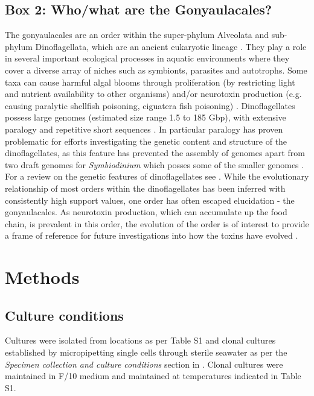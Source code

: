 \documentclass[fleqn,10pt,lineno]{wlpeerj} %
\begin{document}
\subsection*{Box 2: Who/what are the Gonyaulacales?}
\label{sec:dinobox}
The gonyaulacales are an order within the super-phylum Alveolata and sub-phylum Dinoflagellata, which are an ancient eukaryotic lineage \cite{moldowan1998biogeochemical}. 
They play a role in several important ecological processes in aquatic environments where they cover a diverse array of niches such as symbionts, parasites and autotrophs. 
Some taxa can cause harmful algal blooms through proliferation (by restricting light and nutrient availability to other organisms) and/or neurotoxin production (e.g. causing paralytic shellfish poisoning, ciguatera fish poisoning) \cite{murray2016unravelling}.
Dinoflagellates possess large genomes (estimated size range 1.5 to 185 Gbp), with extensive paralogy and repetitive short sequences  \cite{casabianca2017genome}. 
In particular paralogy has proven problematic for efforts investigating the genetic content and structure of the dinoflagellates, as this feature has prevented the assembly of genomes apart from two draft genomes for \textit{Symbiodinium} which posses some of the smaller genomes \cite{shoguchi2013draft,lin2015symbiodinium}. 
For a review on the genetic features of dinoflagellates see \cite{murray2016unravelling}.
While the evolutionary relationship of most orders within the dinoflagellates has been inferred with consistently high support values, one order has often escaped elucidation - the gonyaulacales. 
As neurotoxin production, which can accumulate up the food chain, is prevalent in this order, the evolution of the order is of interest to provide a frame of reference for future investigations into how the toxins have evolved \cite{shalchian2006combined,zhang2007three,saldarriaga2004molecular,hoppenrath2010dinoflagellate,murray2005improving}. 

\section*{Methods}
\subsection*{Culture conditions}
Cultures were isolated from locations as per Table S1 and clonal cultures established by micropipetting single cells through sterile seawater as per the \textit{Specimen collection and culture conditions} section in \cite{kretzschmar2017characterization}. %
Clonal cultures were maintained in F/10 medium \cite{holmes1991strain} and maintained at temperatures indicated in Table S1. %
\end{document}
